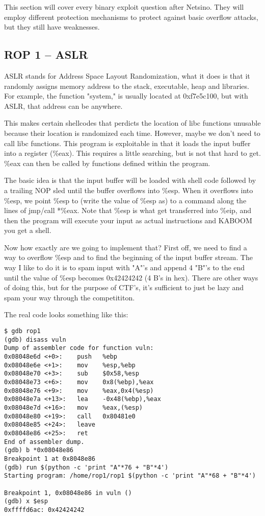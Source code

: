 \documentclass [12 pt, twoside] {article}
\begin{document}
This section will cover every binary exploit question after Netsino.
They will employ different protection mechanisms to protect against
basic overflow attacks, but they still have weaknesses.


\subsection{ROP 1 -- ASLR}


ASLR stands for Address Space Layout Randomization, what it does is that
it randomly assigns memory address to the stack, executable, heap and
libraries. For example, the function "system," is usually located at
0xf7e5c100, but with ASLR, that address can be anywhere.


This makes certain shellcodes that perdicts the location of libc functions
unusable because their location is randomized each time. However, maybe
we don't need to call libc functions. This program is exploitable in that
it loads the input buffer into a register (\%eax). This requires a little
searching, but is not that hard to get. \%eax can then be called
by functions defined within the program.


The basic idea is that the input buffer will be loaded with shell code followed
by a trailing NOP sled until the buffer overflows into \%esp. When it overflows
into \%esp, we point \%esp to (write the value of \%esp as) to a command along
the lines of jmp/call *\%eax. Note that \%esp is what get transferred into \%eip,
and then the program will execute your input as actual instructions and KABOOM
you get a shell.


Now how exactly are we going to implement that? First off, we need to find a way
to overflow \%esp and to find the beginning of the input buffer stream. The way
I like to do it is to spam input with "A"'s and append 4 "B"'s to the end until
the value of \%esp becomes 0x42424242 (4 B's in hex). There are other ways of doing
this, but for the purpose of CTF's, it's sufficient to just be lazy and spam your
way through the competititon.


The real code looks something like this:
\begin{lstlisting}
$ gdb rop1
(gdb) disass vuln
Dump of assembler code for function vuln:
0x08048e6d <+0>:	push   %ebp
0x08048e6e <+1>:	mov    %esp,%ebp
0x08048e70 <+3>:	sub    $0x58,%esp
0x08048e73 <+6>:	mov    0x8(%ebp),%eax
0x08048e76 <+9>:	mov    %eax,0x4(%esp)
0x08048e7a <+13>:	lea    -0x48(%ebp),%eax
0x08048e7d <+16>:	mov    %eax,(%esp)
0x08048e80 <+19>:	call   0x80481e0
0x08048e85 <+24>:	leave  
0x08048e86 <+25>:	ret    
End of assembler dump.
(gdb) b *0x08048e86
Breakpoint 1 at 0x8048e86
(gdb) run $(python -c 'print "A"*76 + "B"*4')
Starting program: /home/rop1/rop1 $(python -c 'print "A"*68 + "B"*4')

Breakpoint 1, 0x08048e86 in vuln ()
(gdb) x $esp
0xffffd6ac:	0x42424242
\end{lstlisting}
\end{document}
